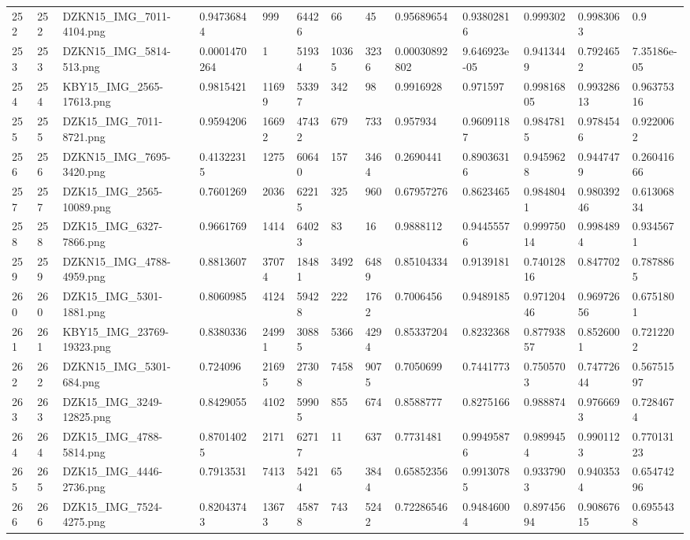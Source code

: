 \documentclass[11pt, a4paper, twoside]{report}
\begin{document}
\begin{longtable}[c]{@{}lllllllllllll@{}}
252 & 252 & DZKN15\_IMG\_7011-4104.png & 0.94736844 & 999 & 64426 & 66 & 45 & 0.95689654 & 0.93802816 & 0.999302 & 0.9983063 & 0.9 \\
253 & 253 & DZKN15\_IMG\_5814-513.png & 0.0001470264 & 1 & 51934 & 10365 & 3236 & 0.00030892802 & 9.646923e-05 & 0.9413449 & 0.7924652 & 7.35186e-05 \\
254 & 254 & KBY15\_IMG\_2565-17613.png & 0.9815421 & 11699 & 53397 & 342 & 98 & 0.9916928 & 0.971597 & 0.99816805 & 0.99328613 & 0.96375316 \\
255 & 255 & DZK15\_IMG\_7011-8721.png & 0.9594206 & 16692 & 47432 & 679 & 733 & 0.957934 & 0.96091187 & 0.9847815 & 0.9784546 & 0.9220062 \\
256 & 256 & DZKN15\_IMG\_7695-3420.png & 0.41322315 & 1275 & 60640 & 157 & 3464 & 0.2690441 & 0.89036316 & 0.9459628 & 0.9447479 & 0.26041666 \\
257 & 257 & DZK15\_IMG\_2565-10089.png & 0.7601269 & 2036 & 62215 & 325 & 960 & 0.67957276 & 0.8623465 & 0.9848041 & 0.98039246 & 0.61306834 \\
258 & 258 & DZK15\_IMG\_6327-7866.png & 0.9661769 & 1414 & 64023 & 83 & 16 & 0.9888112 & 0.94455576 & 0.99975014 & 0.9984894 & 0.9345671 \\
259 & 259 & DZKN15\_IMG\_4788-4959.png & 0.8813607 & 37074 & 18481 & 3492 & 6489 & 0.85104334 & 0.9139181 & 0.74012816 & 0.847702 & 0.7878865 \\
260 & 260 & DZK15\_IMG\_5301-1881.png & 0.8060985 & 4124 & 59428 & 222 & 1762 & 0.7006456 & 0.9489185 & 0.97120446 & 0.96972656 & 0.6751801 \\
261 & 261 & KBY15\_IMG\_23769-19323.png & 0.8380336 & 24991 & 30885 & 5366 & 4294 & 0.85337204 & 0.8232368 & 0.87793857 & 0.8526001 & 0.7212202 \\
262 & 262 & DZKN15\_IMG\_5301-684.png & 0.724096 & 21695 & 27308 & 7458 & 9075 & 0.7050699 & 0.7441773 & 0.7505703 & 0.74772644 & 0.56751597 \\
263 & 263 & DZK15\_IMG\_3249-12825.png & 0.8429055 & 4102 & 59905 & 855 & 674 & 0.8588777 & 0.8275166 & 0.988874 & 0.9766693 & 0.7284674 \\
264 & 264 & DZK15\_IMG\_4788-5814.png & 0.87014025 & 2171 & 62717 & 11 & 637 & 0.7731481 & 0.99495876 & 0.9899454 & 0.9901123 & 0.77013123 \\
265 & 265 & DZK15\_IMG\_4446-2736.png & 0.7913531 & 7413 & 54214 & 65 & 3844 & 0.65852356 & 0.99130785 & 0.9337903 & 0.9403534 & 0.65474296 \\
266 & 266 & DZK15\_IMG\_7524-4275.png & 0.82043743 & 13673 & 45878 & 743 & 5242 & 0.72286546 & 0.94846004 & 0.89745694 & 0.90867615 & 0.6955438 \\

\end{longtable}
\end{document}
